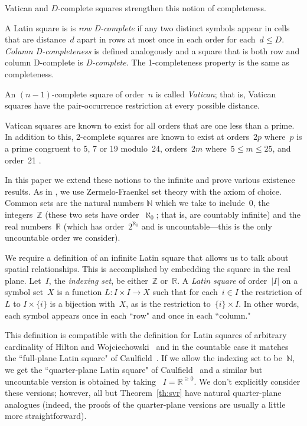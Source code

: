 \documentclass[12pt,a4paper]{article}
\newcommand{\Z}{\mathbb{Z}}
\newcommand{\N}{\mathbb{N}}
\newcommand{\R}{\mathbb{R}}
\begin{document}
Vatican and $D$-complete  squares strengthen this notion of completeness. %

A Latin square is is {\em row D-complete} if any two distinct symbols appear in cells that are distance~$d$ apart in rows at most once in each order for each~$d \leq D$. {\em Column D-completeness} is defined analogously and a square that is both row and column D-complete is {\em D-complete}.  The 1-completeness property is the same as completeness.

An $(n-1)$-complete square of order~$n$ is called {\em Vatican}; that is, Vatican squares have the pair-occurrence restriction at every possible distance.

Vatican squares are known to exist for all orders that are one less than a prime.  In addition to this, 2-complete squares are known to exist at orders~$2p$ where~$p$ is a prime congruent to 5, 7 or 19 modulo~24, orders~$2m$ where~$5 \leq m \leq 25$, and order~21 \cite{TuscanCRC,OllisTFSG}.


In this paper we extend these notions to the infinite and prove various existence results.  As in \cite{CW02}, we use Zermelo-Fraenkel set theory with the axiom of choice.   Common sets are the natural numbers $\N$ which we take to include~0, the integers~$\Z$ (these two sets have order~$\aleph_0$; that is, are countably infinite) and the real numbers~$\R$ (which has order~$2^{\aleph_0}$ and is uncountable---this is the only uncountable order we consider).




We require a definition of an infinite Latin square that allows us to talk about spatial relationships.  This is accomplished by embedding the square in the real plane.  Let~$I$, the {\em indexing set}, be either~$\Z$ or~$\R$.  A {\em Latin square} of order~$|I|$ on a symbol set~$X$ is a function $L: I \times I \rightarrow X$ such that for each~$i \in I$ the restriction of $L$ to $I \times \{i\}$ is a bijection with~$X$, as is the restriction to~$\{i\} \times I$.   In other words, each symbol appears once in each ``row" and once in each ``column."

This definition is  compatible with the definition for Latin squares of arbitrary cardinality of Hilton and Wojciechowski~\cite{HW05} and in the countable case it matches the ``full-plane Latin square" of Caulfield~\cite{Caulfield96}.  If we allow the indexing set to be~$\N$, we get the ``quarter-plane Latin square" of Caulfield~\cite{Caulfield96} and a similar but uncountable version is obtained by taking ~$I = \R^{\geq 0}$.  We don't explicitly consider these versions; however, all but Theorem~\ref{th:svr} have natural quarter-plane analogues (indeed, the proofs of the quarter-plane versions are usually a little more straightforward).
\end{document}
